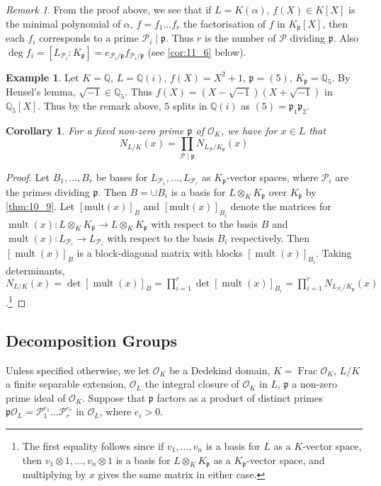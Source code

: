 \documentclass[11pt]{article}
\theoremstyle{definition}
\newtheorem*{example}{Example}
\theoremstyle{plain}
\newtheorem{corollary}[definition]{Corollary}
\theoremstyle{remark}
\newtheorem*{remark}{Remark}
\DeclareMathOperator{\Frac}{Frac}
\DeclareMathOperator{\mult}{mult}
\newcommand{\QQ}{\mathbb{Q}}
\newcommand{\cO}{\mathcal{O}}
\newcommand{\cP}{\mathcal{P}}
\newcommand{\fp}{\mathfrak{p}}
\begin{document}
\begin{remark}
    From the proof above, we see that if $L = K(\alpha)$, $f(X) \in K[X]$ is the minimal polynomial of $\alpha$, $f = f_1 \ldots f_r$ the factorisation of $f$ in $K_\fp[X]$, then each $f_i$ corresponds to a prime $\cP_i \mid \fp$. Thus $r$ is the number of $\cP$ dividing $\fp$. Also $\deg f_i = [L_{\cP_i} : K_\fp] = e_{\cP_i/\fp} f_{\cP_i/\fp}$ (see \autoref{cor:11_6} below).
\end{remark}

\begin{example}
    Let $K = \QQ$, $L = \QQ(i)$, $f(X) = X^2 + 1$, $\fp = (5)$, $K_\fp = \QQ_5$. By Hensel's lemma, $\sqrt{-1} \in \QQ_5$. Thus $f(X) = (X - \sqrt{-1})(X + \sqrt{-1})$ in $\QQ_5[X]$. Thus by the remark above, $5$ splits in $\QQ(i)$ as $(5) = \fp_1 \fp_2$.
\end{example}

\begin{corollary}\label{cor:10_10}
    For a fixed non-zero prime $\fp$ of $\cO_K$, we have for $x \in L$ that
    \begin{equation*}
        N_{L/K}(x) = \prod_{\cP \mid \fp} N_{L_\cP/K_\fp}(x)
    \end{equation*}
\end{corollary}
\begin{proof}
    Let $B_1, \ldots, B_r$ be bases for $L_{\cP_1}, \ldots, L_{\cP_r}$ as $K_\fp$-vector spaces, where $\cP_i$ are the primes dividing $\fp$. Then $B = \cup B_i$ is a basis for $L \otimes_K K_\fp$ over $K_\fp$ by \autoref{thm:10_9}. Let $[\mathrm{mult}(x)]_B$ and $[\mathrm{mult}(x)]_{B_i}$ denote the matrices for $\mult(x) : L \otimes_K K_\fp \to L \otimes_K K_\fp$ with respect to the basis $B$ and $\mult(x) : L_{\cP_i} \to L_{\cP_i}$ with respect to the basis $B_i$ respectively. Then $[\mult(x)]_B$ is a block-diagonal matrix with blocks $[\mult(x)]_{B_i}$. Taking determinants, $N_{L/K}(x) = \det [\mult(x)]_B = \prod_{i=1}^r \det [\mult(x)]_{B_i} = \prod_{i=1}^r N_{L_{\cP_i} / K_\fp}(x)$.\footnote{The first equality follows since if $v_1, \ldots, v_n$ is a basis for $L$ as a $K$-vector space, then $v_1 \otimes 1, \ldots, v_n \otimes 1$ is a basis for $L \otimes_K K_\fp$ as a $K_\fp$-vector space, and multiplying by $x$ gives the same matrix in either case.}
\end{proof}

\subsection{Decomposition Groups}
Unless specified otherwise, we let $\cO_K$ be a Dedekind domain, $K = \Frac{\cO_K}$, $L / K$ a finite separable extension, $\cO_L$ the integral closure of $\cO_K$ in $L$, $\fp$ a non-zero prime ideal of $\cO_K$. Suppose that $\fp$ factors as a product of distinct primes $\fp \cO_L = \cP_1^{e_1} \ldots \cP_r^{e_r}$ in $\cO_L$, where $e_i > 0$.
\end{document}
